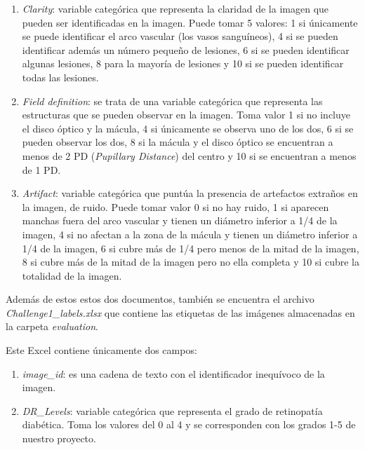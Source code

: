 \begin{enumerate}
    \item \textit{Clarity}: variable categórica que representa la claridad de la imagen que pueden ser identificadas en la imagen. Puede tomar 5 valores: 1 si únicamente se puede identificar el arco vascular (los vasos sanguíneos), 4 si se pueden identificar además un número pequeño de lesiones, 6 si se pueden identificar algunas lesiones, 8 para la mayoría de lesiones y 10 si se pueden identificar todas las lesiones.
    \item \textit{Field definition}: se trata de una variable categórica que representa las estructuras que se pueden observar en la imagen. Toma valor 1 si no incluye el disco óptico y la mácula, 4 si únicamente se observa uno de los dos, 6 si se pueden observar los dos, 8 si la mácula y el disco óptico se encuentran a menos de 2 PD (\textit{Pupillary Distance}) del centro y 10 si se encuentran a menos de 1 PD.
    \item \textit{Artifact}: variable categórica que puntúa la presencia de artefactos extraños en la imagen, de ruido. Puede tomar valor 0 si no hay ruido, 1 si aparecen manchas fuera del arco vascular y tienen un diámetro inferior a 1/4 de la imagen, 4 si no afectan a la zona de la mácula y tienen un diámetro inferior a 1/4 de la imagen, 6 si cubre más de 1/4 pero menos de la mitad de la imagen, 8 si cubre más de la mitad de la imagen pero no ella completa y 10 si cubre la totalidad de la imagen.
\end{enumerate}

Además de estos estos dos documentos, también se encuentra el archivo \textit{Challenge1\_labels.xlsx} que contiene las etiquetas de las imágenes almacenadas en la carpeta \textit{evaluation}.

Este Excel contiene únicamente dos campos:

\begin{enumerate}
    \item \textit{image\_id}: es una cadena de texto con el identificador inequívoco de la imagen.
    \item \textit{DR\_Levels}: variable categórica que representa el grado de retinopatía diabética. Toma los valores del 0 al 4 y se corresponden con los grados 1-5 de nuestro proyecto.
\end{enumerate}